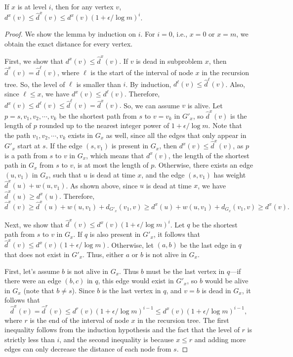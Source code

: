 \begin{lemma}
\label{lem:refined_approx}
   If $x$ is at level $i$, then for any vertex $v$, $d^x(v) \leq \hat{d}^x(v) \leq d^x(v)(1 + \epsilon/ \log m)^i$. 
\end{lemma}
\begin{proof}
    We show the lemma by induction on $i$.  For $i = 0$, i.e., $x=0$ or $x=m$, we obtain the exact distance for every vertex. 
    
    First, we show that $d^x(v) \leq \hat{d}^x(v)$. If $v$ is dead in subproblem $x$, then $\hat{d}^x(v) = \hat{d}^\ell(v)$, where $\ell$ is the start of the interval of node $x$ in the recursion tree. So, the level of $\ell$ is smaller than $i$. By induction, $d^\ell(v) \leq \hat{d}^\ell(v)$. Also, since $\ell \leq x$, we have $d^x(v) \leq d^\ell(v)$. Therefore, 
    $d^x(v) \leq d^\ell(v) \leq \hat{d}^\ell(v) = \hat{d}^x(v).$ So, we can assume $v$ is alive.  
    Let $p = s, v_1, v_2, \cdots, v_k$ be the shortest path from $s$ to $v=v_k$ in $G'_x$, so $\hat{d}^x(v)$ is the length of $p$ rounded up to the nearest integer power of $1 + \epsilon/\log m$.  
    Note that the path $v_1, v_2, \cdots, v_k$ exists in $G_x$ as well, since all the edges that only appear in $G'_x$ start at $s$. 
    If the edge $(s,v_1)$ is present in $G_x$, then $d^x(v) \leq \hat{d}^x(v)$, as $p$ is a path from $s$ to $v$ in $G_x$, which means that $d^x(v)$, the length of the shortest path in $G_x$ from $s$ to $v$, is at most the length of $p$.
    Otherwise, there exists an edge $(u, v_1)$ in $G_x$, such that $u$ is dead at time $x$, and the edge $(s,v_1)$ has weight $\hat{d}^{x}(u) + w(u, v_1)$.
    As shown above, since $u$ is dead at time $x$, we have $\hat{d}^{x}(u) \geq d^x(u)$.
    Therefore, 
    \[\hat{d}^x(v) \geq \hat{d}^{x}(u) + w(u, v_1) + d_{G'_x}(v_1, v) \geq d^x(u) + w(u, v_1) + d_{G_x}(v_1, v) \geq d^x(v).\]
    
    Next, we show that $\hat{d}^x(v) \leq d^x(v)(1 + \epsilon/ \log m)^i$. 
    Let $q$ be the shortest path from $s$ to $v$ in $G_x$.
    If $q$ is also present in $G'_x$, it follows that $\hat{d}^x(v) \leq d^x(v)(1 + \epsilon/ \log m)$.
    Otherwise, let $(a,b)$ be the last edge in $q$ that does not exist in $G'_x$. 
    Thus, either $a$ or $b$ is not alive in $G_x$. 
    
    First, let's assume $b$ is not alive in $G_x$.  Thus $b$ must be the last vertex in $q$---if there were an edge $(b,c)$ in $q$, this edge would exist in $G'_x$, so $b$ would be alive in $G_x$ (note that $b \neq s$).
    Since $b$ is the last vertex in $q$, and $v=b$ is dead in $G_x$, it follows that 
    \[
        \hat{d}^x(v) = \hat{d}^r(v) 
        \leq d^r(v)(1 + \epsilon/ \log m)^{i-1} 
        \leq d^x(v)(1 + \epsilon/ \log m)^{i-1},
    \]
    where $r$ is the end of the interval of node $x$ in the recursion tree.
    The first inequality follows from the induction hypothesis and the fact that the level of $r$ is strictly less than $i$, and the second inequality is because $x \leq r$ and adding more edges can only decrease the distance of each node from $s$.
    

\end{proof}
